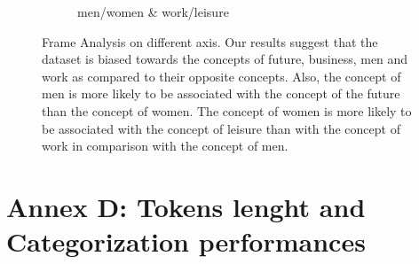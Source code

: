 \documentclass{article}
\begin{document}
\begin{figure}[ht]
\begin{subfigure}{0.49\textwidth}
     \caption{men/women \& work/leisure}
     \label{fig:d}
 \end{subfigure}
 \caption{Frame Analysis on different axis. Our results suggest that the dataset is biased towards the concepts of future, business, men and work as compared to their opposite concepts. Also, the concept of men is more likely to be associated with the concept of the future than the concept of women. The concept of women is more likely to be associated with the concept of leisure than with the concept of work in comparison with the concept of men. } %
  \label{fig:appendix1}
\end{figure}

\FloatBarrier %


\section*{Annex D: Tokens lenght and Categorization performances}
\end{document}
